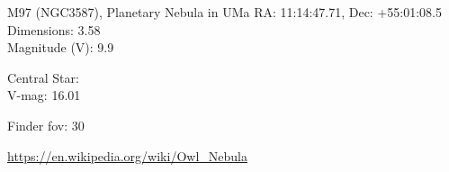 \begin{block}{M97 (NGC3587), Planetary Nebula in UMa}
    RA: 11:14:47.71, Dec: +55:01:08.5 \\ 
    Dimensions: 3.58 \\ 
    Magnitude (V): 9.9

    Central Star: \\ 
      \hspace{1em}V-mag: 16.01 


    Finder fov: 30 

    \url{https://en.wikipedia.org/wiki/Owl_Nebula} 
\end{block}
